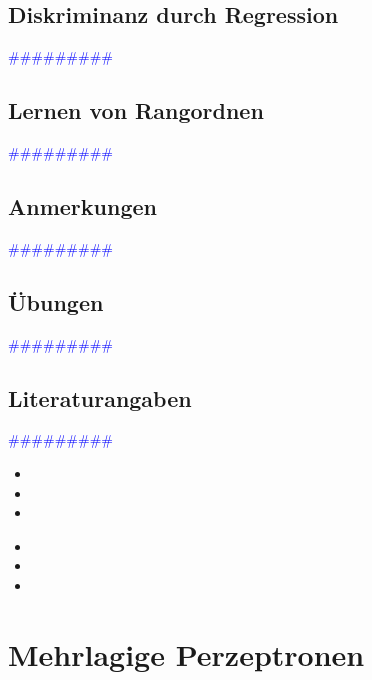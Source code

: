\documentclass{article}
\begin{document}
  \subsection{Diskriminanz durch Regression} %
      \textcolor{blue}{\#\#\#\#\#\#\#\#\#}
  \subsection{Lernen von Rangordnen} %
      \textcolor{blue}{\#\#\#\#\#\#\#\#\#}
  \subsection{Anmerkungen} %
      \textcolor{blue}{\#\#\#\#\#\#\#\#\#}
  \subsection{Übungen} %
      \textcolor{blue}{\#\#\#\#\#\#\#\#\#}
  \subsection{Literaturangaben} %
      \textcolor{blue}{\#\#\#\#\#\#\#\#\#}

      \begin{itemize}
      \color{red}
        \item 
        \item
        \item
      \end{itemize}


      \begin{itemize}
      \color{ForestGreen}
        \item 
        \item
        \item
      \end{itemize}




\newpage
\section{Mehrlagige Perzeptronen} %
\end{document}
